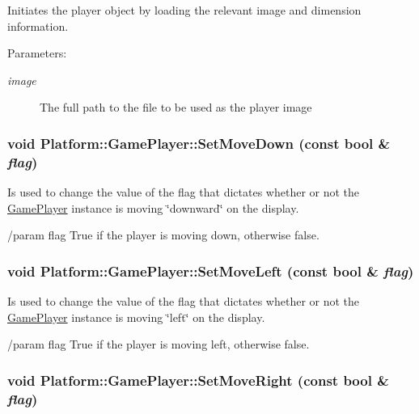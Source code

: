 Initiates the player object by loading the relevant image and dimension information.

\begin{Desc}
\item[Parameters:]
\begin{description}
\item[{\em image}]The full path to the file to be used as the player image \end{description}
\end{Desc}
\hypertarget{class_platform_1_1_game_player_bb1ee12d248d3a1e43ae2fd692671356}{
\subsubsection[{SetMoveDown}]{\setlength{\rightskip}{0pt plus 5cm}void Platform::GamePlayer::SetMoveDown (const bool \& {\em flag})}}
\label{d4/d4e/class_platform_1_1_game_player_bb1ee12d248d3a1e43ae2fd692671356}


Is used to change the value of the flag that dictates whether or not the \hyperlink{class_platform_1_1_game_player}{GamePlayer} instance is moving \char`\"{}downward\char`\"{} on the display.

/param flag True if the player is moving down, otherwise false. \hypertarget{class_platform_1_1_game_player_300162a6d120462c82781da770bc4530}{
\subsubsection[{SetMoveLeft}]{\setlength{\rightskip}{0pt plus 5cm}void Platform::GamePlayer::SetMoveLeft (const bool \& {\em flag})}}
\label{d4/d4e/class_platform_1_1_game_player_300162a6d120462c82781da770bc4530}


Is used to change the value of the flag that dictates whether or not the \hyperlink{class_platform_1_1_game_player}{GamePlayer} instance is moving \char`\"{}left\char`\"{} on the display.

/param flag True if the player is moving left, otherwise false. \hypertarget{class_platform_1_1_game_player_9be44cb10d1dcf3c8eeae08266e76e34}{
\subsubsection[{SetMoveRight}]{\setlength{\rightskip}{0pt plus 5cm}void Platform::GamePlayer::SetMoveRight (const bool \& {\em flag})}}
\label{d4/d4e/class_platform_1_1_game_player_9be44cb10d1dcf3c8eeae08266e76e34}


